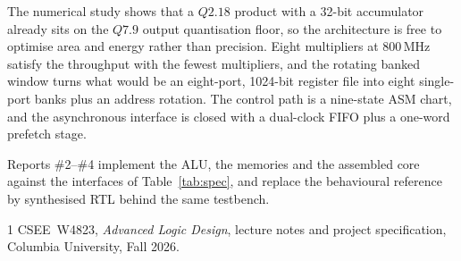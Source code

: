 \documentclass[conference]{IEEEtran}
\newcommand{\qf}[2]{Q#1.#2}
\begin{document}
The numerical study shows that a $\qf{2}{18}$ product with a 32-bit
accumulator already sits on the $\qf{7}{9}$ output quantisation floor, so the
architecture is free to optimise area and energy rather than precision. Eight
multipliers at 800\,MHz satisfy the throughput with the fewest multipliers,
and the rotating banked window turns what would be an eight-port,
1024-bit register file into eight single-port banks plus an address rotation.
The control path is a nine-state ASM chart, and the asynchronous interface is
closed with a dual-clock FIFO plus a one-word prefetch stage.

Reports \#2--\#4 implement the ALU, the memories and the assembled core
against the interfaces of Table~\ref{tab:spec}, and replace the behavioural
reference by synthesised RTL behind the same testbench.

\begin{thebibliography}{1}
CSEE~W4823, \emph{Advanced Logic Design}, lecture notes and project
specification, Columbia University, Fall 2026.
\end{thebibliography}
\end{document}
